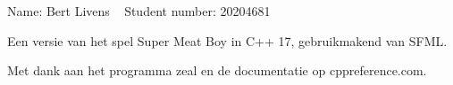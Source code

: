 Name\+: Bert Livens ~\newline
 Student number\+: 20204681

Een versie van het spel Super Meat Boy in C++ 17, gebruikmakend van SFML.

Met dank aan het programma zeal en de documentatie op cppreference.\+com. 